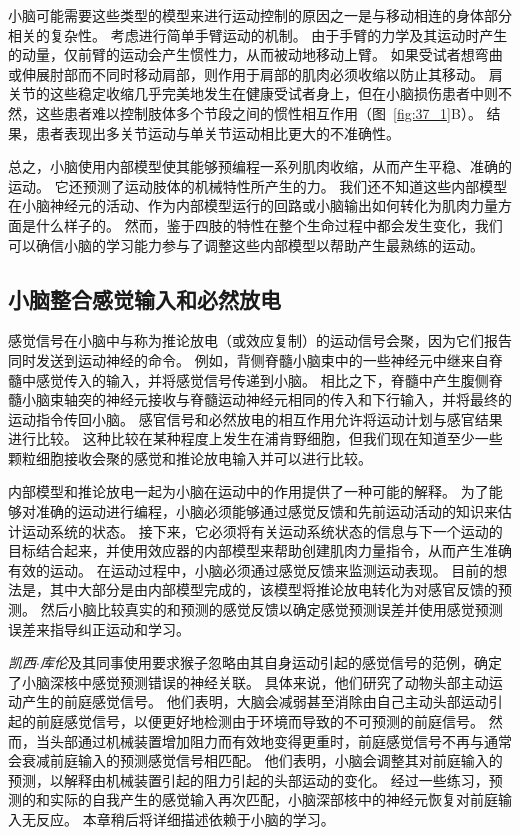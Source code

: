 小脑可能需要这些类型的模型来进行运动控制的原因之一是与移动相连的身体部分相关的复杂性。
考虑进行简单手臂运动的机制。
由于手臂的力学及其运动时产生的动量，仅前臂的运动会产生惯性力，从而被动地移动上臂。
如果受试者想弯曲或伸展肘部而不同时移动肩部，则作用于肩部的肌肉必须收缩以防止其移动。
肩关节的这些稳定收缩几乎完美地发生在健康受试者身上，但在小脑损伤患者中则不然，这些患者难以控制肢体多个节段之间的惯性相互作用（图~\ref{fig:37_1}B）。
结果，患者表现出多关节运动与单关节运动相比更大的不准确性。


总之，小脑使用内部模型使其能够预编程一系列肌肉收缩，从而产生平稳、准确的运动。
它还预测了运动肢体的机械特性所产生的力。 我们还不知道这些内部模型在小脑神经元的活动、作为内部模型运行的回路或小脑输出如何转化为肌肉力量方面是什么样子的。
然而，鉴于四肢的特性在整个生命过程中都会发生变化，我们可以确信小脑的学习能力参与了调整这些内部模型以帮助产生最熟练的运动。



\subsection{小脑整合感觉输入和必然放电}

感觉信号在小脑中与称为推论放电（或效应复制）的运动信号会聚，因为它们报告同时发送到运动神经的命令。
例如，背侧脊髓小脑束中的一些神经元中继来自脊髓中感觉传入的输入，并将感觉信号传递到小脑。
相比之下，脊髓中产生腹侧脊髓小脑束轴突的神经元接收与脊髓运动神经元相同的传入和下行输入，并将最终的运动指令传回小脑。
感官信号和必然放电的相互作用允许将运动计划与感官结果进行比较。
这种比较在某种程度上发生在浦肯野细胞，但我们现在知道至少一些颗粒细胞接收会聚的感觉和推论放电输入并可以进行比较。


内部模型和推论放电一起为小脑在运动中的作用提供了一种可能的解释。
为了能够对准确的运动进行编程，小脑必须能够通过感觉反馈和先前运动活动的知识来估计运动系统的状态。
接下来，它必须将有关运动系统状态的信息与下一个运动的目标结合起来，并使用效应器的内部模型来帮助创建肌肉力量指令，从而产生准确有效的运动。
在运动过程中，小脑必须通过感觉反馈来监测运动表现。
目前的想法是，其中大部分是由内部模型完成的，该模型将推论放电转化为对感官反馈的预测。
然后小脑比较真实的和预测的感觉反馈以确定感觉预测误差并使用感觉预测误差来指导纠正运动和学习。


\textit{凯西$\cdot$库伦}及其同事使用要求猴子忽略由其自身运动引起的感觉信号的范例，确定了小脑深核中感觉预测错误的神经关联。
具体来说，他们研究了动物头部主动运动产生的前庭感觉信号。
他们表明，大脑会减弱甚至消除由自己主动头部运动引起的前庭感觉信号，以便更好地检测由于环境而导致的不可预测的前庭信号。
然而，当头部通过机械装置增加阻力而有效地变得更重时，前庭感觉信号不再与通常会衰减前庭输入的预测感觉信号相匹配。
他们表明，小脑会调整其对前庭输入的预测，以解释由机械装置引起的阻力引起的头部运动的变化。
经过一些练习，预测的和实际的自我产生的感觉输入再次匹配，小脑深部核中的神经元恢复对前庭输入无反应。
本章稍后将详细描述依赖于小脑的学习。



